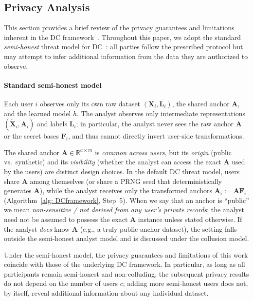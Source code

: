 \documentclass[final,3p,times]{elsarticle}
\theoremstyle{plain}
\newcommand{\matr}[1]{\bm{#1}}        %
\begin{document}
\subsection{Privacy Analysis}
\label{subsection: DCprivacy}

This section provides a brief review of the privacy guarantees and limitations inherent in the DC framework~\cite{DCprivacy}. Throughout this paper, we adopt the standard \emph{semi-honest} threat model for DC~\cite{DCprivacy, NRI-DC, DC-DP}: all parties follow the prescribed protocol but may attempt to infer additional information from the data they are authorized to observe.

\paragraph{Standard semi-honest model}
Each user \(i\) observes only its own raw dataset \((\matr{X}_i,\matr{L}_i)\), the shared anchor \(\matr{A}\), and the learned model \(h\). The analyst observes only intermediate representations \((\tilde{\matr{X}}_i,\matr{A}_i)\) and labels \(\matr{L}_i\); in particular, the analyst never sees the raw anchor \(\matr{A}\) or the secret bases \(\matr{F}_i\), and thus cannot directly invert user-side transformations. 

The shared anchor $\matr{A}\in\mathbb{R}^{a\times m}$ is \emph{common across users}, but its \emph{origin} (public vs.\ synthetic) and its \emph{visibility} (whether the analyst can access the exact $\matr{A}$ used by the users) are distinct design choices. In the default DC threat model, users share $\matr{A}$ among themselves (or share a PRNG seed that deterministically generates $\matr{A}$), while the analyst receives only the transformed anchors $\matr{A}_i := \matr{A}\matr{F}_i$ (Algorithm~\ref{alg: DCframework}, Step~5). When we say that an anchor is ``public'' we mean \emph{non-sensitive / not derived from any user's private records}; the analyst need not be assumed to possess the exact $\matr{A}$ instance unless stated otherwise. If the analyst \emph{does} know $\matr{A}$ (e.g., a truly public anchor dataset), the setting falls outside the semi-honest analyst model and is discussed under the collusion model.

Under the semi-honest model, the privacy guarantees and limitations of this work coincide with those of the underlying DC framework. In particular, as long as all participants remain semi-honest and non-colluding, the subsequent privacy results do not depend on the number of users $ c$; adding more semi-honest users does not, by itself, reveal additional information about any individual dataset.
\end{document}
